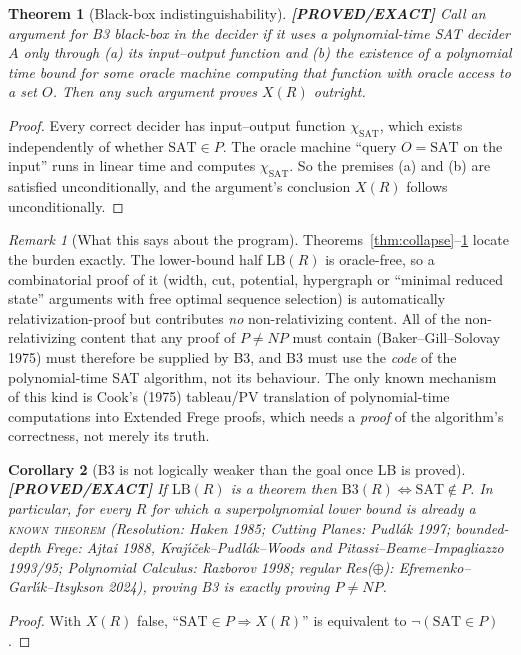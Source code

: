 \documentclass[11pt]{article}
\newtheorem{theorem}{Theorem}
\newtheorem{corollary}[theorem]{Corollary}
\theoremstyle{definition}
\theoremstyle{remark}
\newtheorem*{remark}{Remark}
\newcommand{\SAT}{\mathrm{SAT}}
\newcommand{\status}[1]{\textbf{[#1]}}
\begin{document}
\begin{theorem}[Black-box indistinguishability]\label{thm:bb}
\status{PROVED/EXACT}
Call an argument for B3 \emph{black-box in the decider} if it uses a polynomial-time SAT
decider $A$ only through (a) its input--output function and (b) the existence of a polynomial
time bound for some oracle machine computing that function with oracle access to a set $O$.
Then any such argument proves $X(R)$ outright.
\end{theorem}
\begin{proof}
Every correct decider has input--output function $\chi_{\SAT}$, which exists independently of
whether $\SAT\in P$. The oracle machine ``query $O=\SAT$ on the input'' runs in linear time and
computes $\chi_{\SAT}$. So the premises (a) and (b) are satisfied unconditionally, and the
argument's conclusion $X(R)$ follows unconditionally.
\end{proof}

\begin{remark}[What this says about the program]
Theorems~\ref{thm:collapse}--\ref{thm:bb} locate the burden exactly. The lower-bound half
$\mathrm{LB}(R)$ is oracle-free, so a combinatorial proof of it (width, cut, potential,
hypergraph or ``minimal reduced state'' arguments with free optimal sequence selection) is
automatically relativization-proof but contributes \emph{no} non-relativizing content. All of the
non-relativizing content that any proof of $P\neq NP$ must contain (Baker--Gill--Solovay 1975)
must therefore be supplied by B3, and B3 must use the \emph{code} of the polynomial-time SAT
algorithm, not its behaviour. The only known mechanism of this kind is Cook's (1975)
tableau/PV translation of polynomial-time computations into Extended Frege proofs, which needs
a \emph{proof} of the algorithm's correctness, not merely its truth.
\end{remark}

\begin{corollary}[B3 is not logically weaker than the goal once LB is proved]\label{cor:equiv}
\status{PROVED/EXACT}
If $\mathrm{LB}(R)$ is a theorem then $\mathrm{B3}(R)\iff\SAT\notin P$.
In particular, for every $R$ for which a superpolynomial lower bound is already a
\textsc{known theorem} (Resolution: Haken 1985; Cutting Planes: Pudl\'ak 1997;
bounded-depth Frege: Ajtai 1988, Kraj\'{\i}\v{c}ek--Pudl\'ak--Woods and
Pitassi--Beame--Impagliazzo 1993/95; Polynomial Calculus: Razborov 1998;
regular Res($\oplus$): Efremenko--Garl\'{\i}k--Itsykson 2024), proving B3 is exactly proving
$P\neq NP$.
\end{corollary}
\begin{proof}
With $X(R)$ false, ``$\SAT\in P\Rightarrow X(R)$'' is equivalent to $\neg(\SAT\in P)$.
\end{proof}
\end{document}
